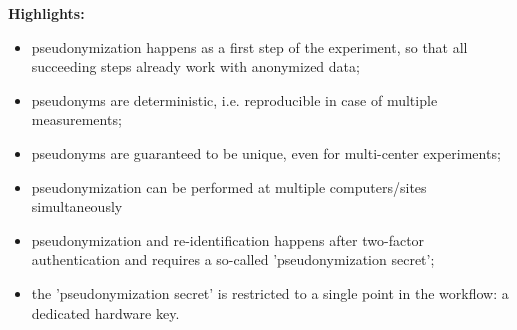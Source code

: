 \textbf{Highlights: }
\begin{itemize}
    \item pseudonymization happens as a first step of the experiment, so that all succeeding steps already work with anonymized data;
    \item pseudonyms are deterministic, i.e. reproducible in case of multiple measurements;
    \item pseudonyms are guaranteed to be unique, even for multi-center experiments;
    \item pseudonymization can be performed at multiple computers/sites simultaneously
    \item pseudonymization and re-identification happens after two-factor authentication and requires a so-called 'pseudonymization secret';
    \item the 'pseudonymization secret' is restricted to a single point in the workflow: a dedicated hardware key.
\end{itemize}




